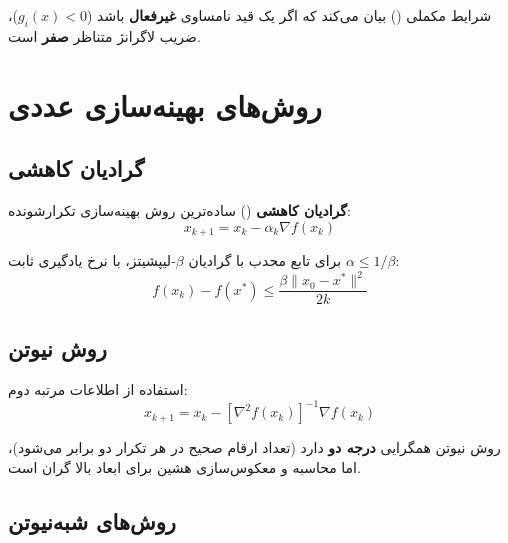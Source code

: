 \documentclass{matinbook}
\begin{document}
    \begin{remark}
        شرایط مکملی
        ()
        بیان می‌کند که اگر یک قید نامساوی
        \textbf{غیرفعال} باشد ($g_{i}(x) < 0$)،
        ضریب لاگرانژ متناظر \textbf{صفر} است.
        \label{rem:complementary}
    \end{remark}
    
    \section{روش‌های بهینه‌سازی عددی}
    
    \subsection{گرادیان کاهشی}
    
    \begin{definition}
        \textbf{گرادیان کاهشی}
        () ساده‌ترین
        روش بهینه‌سازی تکرارشونده:
        \[
        x_{k+1} = x_{k} - \alpha_{k} \nabla f(x_{k})
        \]
        \label{def:gradient-descent}
    \end{definition}
    
    \begin{theorem}
        برای تابع محدب با گرادیان
        $\beta$-لیپشیتز، با نرخ یادگیری
        ثابت $\alpha \leq 1/\beta$:
        \[
        f(x_{k}) - f(x^{*}) \leq
        \frac{\beta\|x_{0} - x^{*}\|^{2}}{2k}
        \]
        \label{thm:gd-convergence}
    \end{theorem}
    
    \subsection{روش نیوتن}
    
    \begin{definition}
        استفاده از اطلاعات مرتبه دوم:
        \[
        x_{k+1} = x_{k} - [\nabla^{2}f(x_{k})]^{-1}
        \nabla f(x_{k})
        \]
        \label{def:newton-method}
    \end{definition}
    
    روش نیوتن
    همگرایی \textbf{درجه دو} دارد
    (تعداد ارقام صحیح در هر تکرار دو برابر می‌شود)،
    اما محاسبه و معکوس‌سازی هشین
    برای ابعاد بالا گران است.
    
    \subsection{روش‌های شبه‌نیوتن}
    
\end{document}
